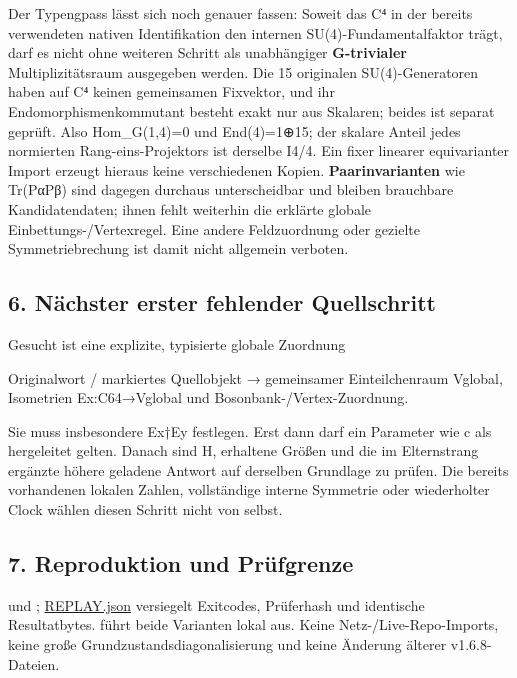 Der Typengpass lässt sich noch genauer fassen: Soweit das C⁴ in der
bereits verwendeten nativen Identifikation den internen
SU(4)-Fundamentalfaktor trägt, darf es nicht ohne weiteren Schritt als
unabhängiger \textbf{G-trivialer} Multiplizitätsraum ausgegeben werden.
Die 15 originalen SU(4)-Generatoren haben auf C⁴ keinen gemeinsamen
Fixvektor, und ihr Endomorphismenkommutant besteht exakt nur aus
Skalaren; beides ist separat geprüft. Also Hom\_G(1,4)=0 und
End(4)=1⊕\allowbreak{}15; der skalare Anteil jedes normierten Rang-eins-Projektors
ist derselbe I4/4. Ein fixer linearer equivarianter Import erzeugt
hieraus keine verschiedenen Kopien. \textbf{Paarinvarianten} wie
Tr(PαPβ) sind dagegen durchaus unterscheidbar und bleiben brauchbare
Kandidatendaten; ihnen fehlt weiterhin die erklärte globale
Einbettungs-/Vertexregel. Eine andere Feldzuordnung oder gezielte
Symmetriebrechung ist damit nicht allgemein verboten.

\subsection{6. Nächster erster fehlender
Quellschritt}\label{nuxe4chster-erster-fehlender-quellschritt}

Gesucht ist eine explizite, typisierte globale Zuordnung

Originalwort / markiertes Quellobjekt → gemeinsamer Einteilchenraum
Vglobal, Isometrien Ex:C64→Vglobal und Bosonbank-/Vertex-Zuordnung.

Sie muss insbesondere Ex†Ey festlegen. Erst dann darf ein Parameter wie
c als hergeleitet gelten. Danach sind H, erhaltene Größen und die im
Elternstrang ergänzte höhere geladene Antwort auf derselben Grundlage zu
prüfen. Die bereits vorhandenen lokalen Zahlen, vollständige interne
Symmetrie oder wiederholter Clock wählen diesen Schritt nicht von
selbst.

\subsection{7. Reproduktion und
Prüfgrenze}\label{reproduktion-und-pruxfcfgrenze}

 und
;
\url{REPLAY.json} versiegelt Exitcodes, Prüferhash und identische
Resultatbytes.  führt beide Varianten lokal aus.
Keine Netz-/Live-Repo-Imports, keine große Grundzustandsdiagonalisierung
und keine Änderung älterer v1.6.8-Dateien.

